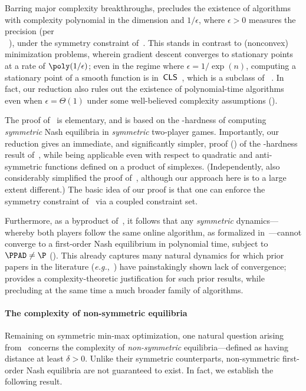 Barring major complexity breakthroughs,  precludes the existence of algorithms with complexity polynomial in the dimension and $1/\epsilon$, where $\epsilon > 0$ measures the precision (per\\~), under the symmetry constraint of~. This stands in contrast to (nonconvex) minimization problems, wherein gradient descent converges to stationary points at a rate of $\poly(1/\epsilon)$; even in the regime where $\epsilon = 1/\exp(n)$, computing a stationary point of a smooth function is in~$\mathsf{CLS}$~\citep{Daskalakis11:Continuous}, which is a subclass of \PPAD~\citep{Fearnley23:Complexity}. In fact, our reduction also rules out the existence of polynomial-time algorithms even when $\epsilon = \Theta(1)$ under some well-believed complexity assumptions ().

The proof of~ is elementary, and is based on the \PPAD-hardness of computing \emph{symmetric} Nash equilibria in \emph{symmetric} two-player games. Importantly, our reduction gives an immediate, and significantly simpler, proof () of the \PPAD-hardness result of~\citet{DSZ21}, while being applicable even with respect to quadratic and anti-symmetric functions defined on a product of simplexes. (Independently, \citet{Bernasconi24:Role} also considerably simplified the proof of~\citet{DSZ21}, although our approach here is to a large extent different.) The basic idea of our proof is that one can enforce the symmetry constraint of~ via a coupled constraint set.

Furthermore, as a byproduct of~, it follows that any \emph{symmetric} dynamics---whereby both players follow the same online algorithm, as formalized in~---cannot converge to a first-order Nash equilibrium in polynomial time, subject to $\PPAD \neq \P$ (). This already captures many natural dynamics for which prior papers in the literature (\emph{e.g.},~\citet{kalogiannis2021teamwork}) have painstakingly shown lack of convergence;  provides a complexity-theoretic justification for such prior results, while precluding at the same time a much broader family of algorithms.

\paragraph{The complexity of non-symmetric equilibria} Remaining on symmetric min-max optimization, one natural question arising from~ concerns the complexity of \emph{non-symmetric} equilibria---defined as having distance at least $\delta > 0$. Unlike their symmetric counterparts, non-symmetric first-order Nash equilibria are not guaranteed to exist. In fact, we establish the following result.

